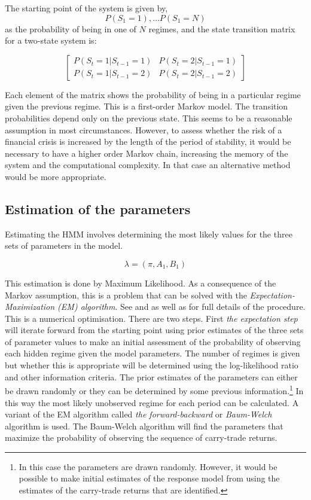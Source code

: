 \documentclass[12pt, a4paper, oneside]{article}\usepackage[]{graphicx}\usepackage[]{color}
\begin{document}
The starting point of the system is given by,
\begin{equation*}
P(S_1 = 1), \dots P(S_1 = N)
\end{equation*}
as the probability of being in one of $N$ regimes, and the state transition matrix for a two-state system is:

\begin{equation*}
\begin{bmatrix}
P(S_t = 1|S_{t-1}=1)  & P(S_t = 2|S_{t-1}=1)\\
P(S_t = 1|S_{t-1}=2)  & P(S_t = 2|S_{t-1}=2)
\end{bmatrix}
\end{equation*}

  Each element of the matrix shows the probability of being in a particular regime given the previous regime. This is a first-order Markov model.  The transition probabilities depend only on the previous state. This seems to be a reasonable assumption in most circumstances.  However, to assess whether the risk of a financial crisis is increased by the length of the period of stability, it would be necessary to have a higher order Markov chain, increasing the memory of the system and the computational complexity.  In that case an alternative method would be more appropriate. 

\subsection{Estimation of the parameters}
Estimating the HMM involves determining the most likely values for the three sets of parameters in the model.  

\begin{equation}
\lambda = (\pi, A_1, B_1)
\end{equation}

This estimation is done by Maximum Likelihood. As a consequence of the Markov assumption, this is a problem that can be solved with the \emph{Expectation-Maximization (EM) algorithm}.  See \citet{dempster1977maximum} and \citet{Hamilton1989} as well as \citet{depmixS4} for full details of the procedure.  This is a numerical optimisation.  There are two steps. First \emph{the expectation step} will iterate forward from the starting point using prior estimates of the three sets of parameter values  to make an initial assessment of the probability of observing each hidden regime given the model parameters.  The number of regimes is given but whether this is appropriate will be determined using the log-likelihood ratio and other information criteria.  The prior estimates of the parameters can either be drawn randomly or they can be determined by some previous information.\footnote{In this case the parameters are drawn randomly.  However, it would be possible to make initial estimates of the response model from \citet{Hayward2013} using the estimates of the carry-trade returns that are identified.}  In this way the most likely unobserved regime for each period can be calculated. A variant of the EM algorithm called \emph{the forward-backward} or \emph{Baum-Welch} algorithm \citet{Baum1970} is used.   The Baum-Welch algorithm will find the parameters that maximize the probability of observing the sequence of carry-trade returns.  
\end{document}

